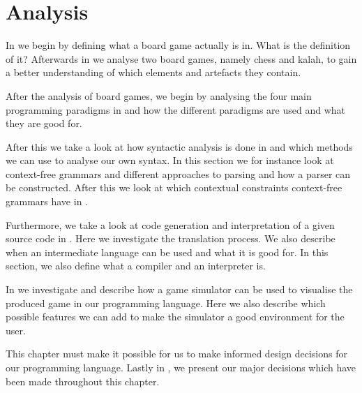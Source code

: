 \chapter{Analysis}
\label{chap:analysis}

In  we begin by defining what a board game
actually is in.  What is the definition of it? Afterwards in
 we analyse two board games, namely chess and kalah,
to gain a better understanding of which elements and artefacts they contain. 

After the analysis of board games, we begin by analysing the four main
programming paradigms in  and how the different paradigms
are used and what they are good for.

After this we take a look at how syntactic analysis is done in
 and which methods we can use to analyse our own
syntax. In this section we for instance look at context-free grammars and
different approaches to parsing and how a parser can be constructed. After this
we look at which contextual constraints context-free grammars have in
. 

Furthermore, we take a look at code generation and interpretation of a given
source code in . Here we investigate
the translation process. We also describe when an intermediate language can be
used and what it is good for. In this section, we also define what a compiler
and an interpreter is.

In  we investigate and describe how a game simulator can
be used to visualise the produced game in our programming language. Here we also
describe which possible features we can add to make the simulator a good
environment for the user. 

This chapter must make it possible for us to make informed design decisions for
our programming language. Lastly in , we present
our major decisions which have been made throughout this chapter.









